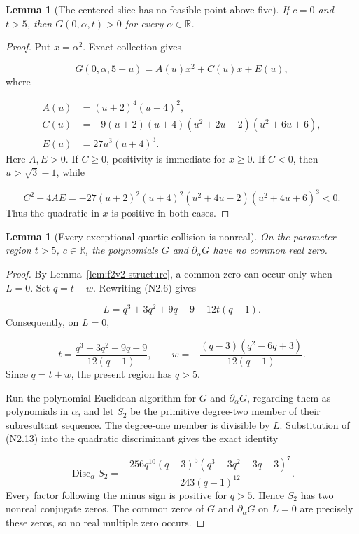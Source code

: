 \documentclass[11pt]{article}
\newtheorem{lemma}[theorem]{Lemma}
\theoremstyle{definition}
\theoremstyle{remark}
\begin{document}
\begin{lemma}[The centered slice has no feasible point above five]
\label{lem:f2v2-centered}
If \(c=0\) and \(t>5\), then \(G(0,\alpha,t)>0\) for every
\(\alpha\in\mathbb R\).
\end{lemma}

\begin{proof}
Put \(x=\alpha^2\).  Exact collection gives

\[
 G(0,\alpha,5+u)=A(u)x^2+C(u)x+E(u),
 \tag{N2.9}
\]
where

\[
\begin{aligned}
A(u)&=(u+2)^4(u+4)^2,\\
C(u)&=-9(u+2)(u+4)(u^2+2u-2)(u^2+6u+6),\\
E(u)&=27u^3(u+4)^3.
\end{aligned}
\tag{N2.10}
\]
Here \(A,E>0\).  If \(C\ge0\), positivity is immediate for \(x\ge0\).
If \(C<0\), then \(u>\sqrt3-1\), while

\[
 C^2-4AE
 =-27(u+2)^2(u+4)^2(u^2+4u-2)(u^2+4u+6)^3<0.
 \tag{N2.11}
\]
Thus the quadratic in \(x\) is positive in both cases.
\end{proof}

\begin{lemma}[Every exceptional quartic collision is nonreal]
\label{lem:f2v2-exceptional}
On the parameter region \(t>5\), \(c\in\mathbb R\), the polynomials
\(G\) and \(\partial_\alpha G\) have no common real zero.
\end{lemma}

\begin{proof}
By Lemma~\ref{lem:f2v2-structure}, a common zero can occur only when
\(L=0\).  Set \(q=t+w\).  Rewriting \textup{(N2.6)} gives

\[
 L=q^3+3q^2+9q-9-12t(q-1).
 \tag{N2.12}
\]
Consequently, on \(L=0\),

\[
 t=\frac{q^3+3q^2+9q-9}{12(q-1)},
 \qquad
 w=-\frac{(q-3)(q^2-6q+3)}{12(q-1)}.
 \tag{N2.13}
\]
Since \(q=t+w\), the present region has \(q>5\).

Run the polynomial Euclidean algorithm for \(G\) and
\(\partial_\alpha G\), regarding them as polynomials in \(\alpha\), and
let \(S_2\) be the primitive degree-two member of their subresultant
sequence.  The degree-one member is divisible by \(L\).  Substitution of
\textup{(N2.13)} into the quadratic discriminant gives the exact identity

\[
 \boxed{
 \operatorname{Disc}_{\alpha}S_2
 =-
 \frac{256q^{10}(q-3)^5
 (q^3-3q^2-3q-3)^7}
 {243(q-1)^{12}}.}
 \tag{N2.14}
\]
Every factor following the minus sign is positive for \(q>5\).  Hence
\(S_2\) has two nonreal conjugate zeros.  The common zeros of \(G\) and
\(\partial_\alpha G\) on \(L=0\) are precisely these zeros, so no real
multiple zero occurs.
\end{proof}
\end{document}
